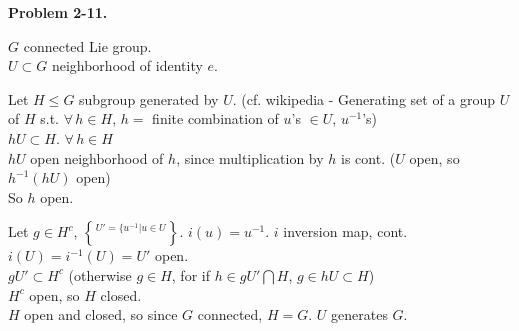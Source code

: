 \documentclass[11pt]{amsart}
\theoremstyle{definition}
\newcommand{\problemhead}[1]{\medskip\noindent\textbf{Problem #1.} }
\begin{document}
\problemhead{2-11}

$G$ connected Lie group.   \\
$U \subset G$ neighborhood of identity $e$.

Let $H \leq G$ subgroup generated by $U$.  (cf. wikipedia - Generating set of a group $U$ of $H$ s.t. $\forall \, h \in H$, $h = $ finite combination of $u$'s $\in U$, $u^{-1}$'s) \\
$hU \subset H$.  $\forall \, h \in H$ \\
$hU$ open neighborhood of $h$, since multiplication by $h$ is cont. ($U$ open, so $h^{-1}(hU)$ open) \\
So $h$ open.

Let $g\in H^c$, $U' = \lbrace u^{-1} | u \in U \brace$.  $i(u) = u^{-1}$.  $i$ inversion map, cont.  $i(U) = i^{-1}(U) = U'$ open.   \\
$gU' \subset H^c$ (otherwise $g\in H$, for if $h \in gU' \bigcap H$, $g \in hU \subset H$) \\
$H^c$ open, so $H$ closed.  \\
$H$ open and closed, so since $G$ connected, $H=G$.  $U$ generates $G$.
\end{document}
